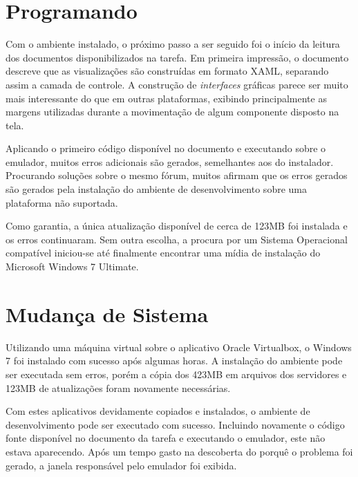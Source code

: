 \documentclass{article}
\begin{document}
\section{Programando}
\label{sec:programando}

Com o ambiente instalado, o próximo passo a ser seguido foi o início da leitura
dos documentos disponibilizados na tarefa. Em primeira impressão, o documento
descreve que as visualizações são construídas em formato XAML, separando assim a
camada de controle. A construção de \textit{interfaces} gráficas parece ser
muito mais interessante do que em outras plataformas, exibindo principalmente as
margens utilizadas durante a movimentação de algum componente disposto na tela.

Aplicando o primeiro código disponível no documento e executando sobre o
emulador, muitos erros adicionais são gerados, semelhantes aos do instalador.
Procurando soluções sobre o mesmo fórum, muitos afirmam que os erros gerados são
gerados pela instalação do ambiente de desenvolvimento sobre uma plataforma não
suportada.

Como garantia, a única atualização disponível de cerca de 123MB foi instalada e
os erros continuaram. Sem outra escolha, a procura por um Sistema Operacional
compatível iniciou-se até finalmente encontrar uma mídia de instalação do
Microsoft Windows 7 Ultimate.

\section{Mudança de Sistema}
\label{sec:sistema}

Utilizando uma máquina virtual sobre o aplicativo Oracle Virtualbox, o Windows 7
foi instalado com sucesso após algumas horas. A instalação do ambiente pode ser
executada sem erros, porém a cópia dos 423MB em arquivos dos servidores e
123MB de atualizações foram novamente necessárias.

Com estes aplicativos devidamente copiados e instalados, o ambiente de
desenvolvimento pode ser executado com sucesso. Incluindo novamente o código
fonte disponível no documento da tarefa e executando o emulador, este não estava
aparecendo. Após um tempo gasto na descoberta do porquê o problema foi gerado, a
janela responsável pelo emulador foi exibida.
\end{document}
